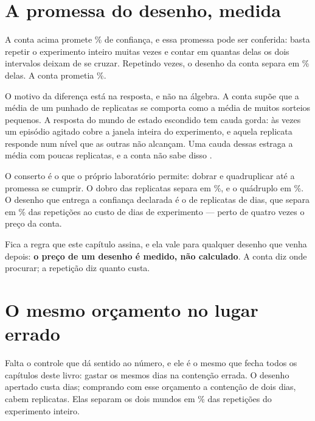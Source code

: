 \section{A promessa do desenho, medida}

A conta acima promete \numDesenhoConfiancaPct\% de confiança, e essa promessa pode ser conferida:
basta repetir o experimento inteiro muitas vezes e contar em quantas delas os dois intervalos
deixam de se cruzar. Repetindo \numDesenhoMeta{} vezes, o desenho da conta separa em
\numDesenhoSeparaPlanejadaPct\% delas. A conta prometia \numDesenhoConfiancaPct\%.

O motivo da diferença está na resposta, e não na álgebra. A conta supõe que a média de um punhado
de replicatas se comporta como a média de muitos sorteios pequenos. A resposta do mundo de estado
escondido tem cauda gorda: às vezes um episódio agitado cobre a janela inteira do experimento, e
aquela replicata responde num nível que as outras não alcançam. Uma cauda dessas estraga a média
com poucas replicatas, e a conta não sabe disso \cite{taleb2020much}.

O conserto é o que o próprio laboratório permite: dobrar e quadruplicar até a promessa se cumprir.
O dobro das replicatas separa em \numDesenhoSeparaDobroPct\%, e o quádruplo em
\numDesenhoSeparaQuadruploPct\%. O desenho que entrega a confiança declarada é o de
\numDesenhoEntregueReplicatas{} replicatas de \numDesenhoApertadoContensao{} dias, que separa em
\numDesenhoEntreguePct\% das repetições ao custo de \numDesenhoEntregueDias{} dias de experimento ---
perto de quatro vezes o preço da conta.

Fica a regra que este capítulo assina, e ela vale para qualquer desenho que venha depois:
\textbf{o preço de um desenho é medido, não calculado}. A conta diz onde procurar; a repetição diz
quanto custa.

\section{O mesmo orçamento no lugar errado}

Falta o controle que dá sentido ao número, e ele é o mesmo que fecha todos os capítulos deste
livro: gastar os mesmos dias na contenção errada. O desenho apertado custa
\numDesenhoApertadoDias{} dias; comprando com esse orçamento a contenção de dois dias, cabem
\numDesenhoMesmaContaReplicatas{} replicatas. Elas separam os dois mundos em
\numDesenhoSeparaCurtaPct\% das repetições do experimento inteiro.

